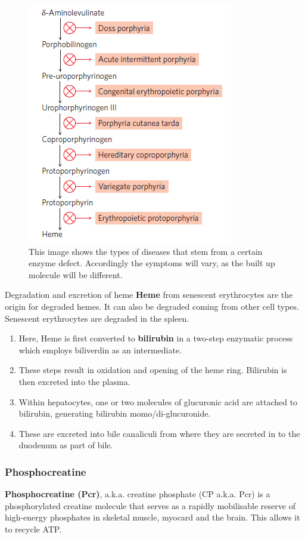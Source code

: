 \documentclass[../main.tex]{subfiles}
\begin{document}
\begin{figure}[H]
	\centering
	\includegraphics[width=0.3\linewidth]{por_sick}
	\caption{This image shows the types of diseases that stem from a certain enzyme defect. Accordingly the symptoms will vary, as the built up molecule will be different.}
	\label{fig:porsick}
\end{figure}

\begin{RemarkWithTitel}{Degradation and excretion of heme}
	\textbf{\gls{Heme}} from senescent erythrocytes are the origin for degraded hemes. It can also be degraded coming from other cell types. Senescent erythrocytes are degraded in the spleen. 
	\begin{enumerate}
		\item Here, Heme is first converted to \textbf{\gls{bilirubin}} in a two-step enzymatic process which employs biliverdin as an intermediate.
		\item These steps result in oxidation and opening of the heme ring. Bilirubin is then excreted into the plasma.
		\item Within hepatocytes, one or two molecules of glucuronic acid are attached to bilirubin, generating bilirubin momo/di-glucuronide. 
		\item These are excreted into bile canaliculi from where they are secreted in to the duodenum as part of bile.
	\end{enumerate} 
	
\end{RemarkWithTitel}


\subsubsection{Phosphocreatine}

\textbf{\gls{Phosphocreatine (Pcr)}}, a.k.a. creatine phosphate (CP a.k.a. Pcr) is a phosphorylated creatine molecule that serves as a rapidly mobilisable reserve of high-energy phosphates in skeletal muscle, myocard and the brain. This allows it to recycle ATP. 
\end{document}
